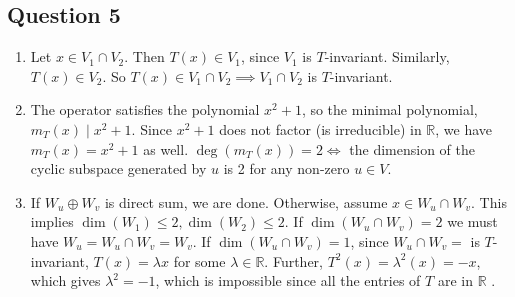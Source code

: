 \documentclass{article}
\begin{document}
\subsection*{Question 5}
\begin{enumerate}[label=(\alph*)]
\item Let $x \in V_1 \cap V_2$. Then $T(x) \in V_1$, since $V_1$ is $T$-invariant. Similarly, $T(x) \in V_2$. So $T(x) \in V_1 \cap V_2 \implies V_1 \cap V_2$ is $T$-invariant.
\item The operator satisfies the polynomial $x^2+1$, so the minimal polynomial, $m_T(x) \mid x^2+1$. Since $x^2+1$ does not factor (is irreducible) in $\mathbb{R}$, we have $m_T(x)=x^2+1$ as well. $\deg(m_T(x)) = 2 \iff $ the dimension of the cyclic subspace generated by $u$ is 2 for any non-zero $u \in V$. 
\item If $W_u \oplus W_v$ is direct sum, we are done. Otherwise, assume $x \in W_u \cap W_v$. This implies $\dim(W_1) \leq 2, \dim(W_2) \leq 2$. If $\dim(W_u \cap W_v)=2$ we must have $W_u = W_u \cap W_v = W_v$. If $\dim(W_u \cap W_v)=1$, since $W_u \cap W_v=$ is $T$-invariant, $T(x)=\lambda x$ for some $\lambda \in \mathbb{R}$. Further, $T^2(x)=\lambda^2(x)=-x$, which gives $\lambda^2=-1$, which is impossible since all the entries of $T$ are in $\mathbb{R}$ .
\end{enumerate}
\end{document}

